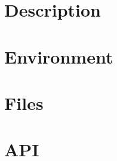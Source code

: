 \documentclass[12pt,a4paper]{book}
\begin{document}


\section{Description}


\section{Environment}


\section{Files}


\section{API}

\end{document}
